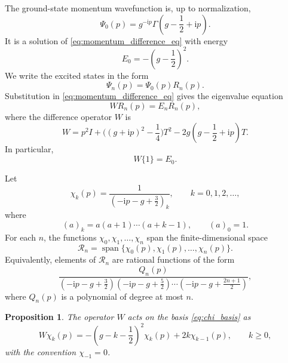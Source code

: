 \documentclass[10pt,a4paper]{amsart}
\newcommand{\ii}{\mathrm{i}}
\newcommand{\cR}{\mathcal{R}}
\numberwithin{equation}{section}
\newtheorem{proposition}[theorem]{Proposition}
\begin{document}
The ground-state momentum wavefunction is, up to normalization,
\begin{equation}
  \Psi_0(p)=g^{-\ii p}\Gamma\!\left(g-\frac12+\ii p\right).
  \label{eq:ground_state}
\end{equation}
It is a solution of \eqref{eq:momentum_difference_eq} with energy
\begin{equation}
  E_0=-\left(g-\frac12\right)^2.
\end{equation}
We write the excited states in the form
\begin{equation}
  \Psi_n(p)=\Psi_0(p)R_n(p).
  \label{eq:factorization}
\end{equation}
Substitution in \eqref{eq:momentum_difference_eq} gives the eigenvalue equation
\begin{equation}
  W R_n(p)=E_n R_n(p),
  \label{eq:W_eigenvalue}
\end{equation}
where the difference operator $W$ is
\begin{equation}
  W=p^2I+\bigl((g+\ii p)^2-\frac14\bigr)T^2
  -2g\left(g-\frac12+\ii p\right)T.
  \label{eq:W_operator}
\end{equation}
In particular,
\begin{equation}
  W\{1\}=E_0.
\end{equation}

Let
\begin{equation}
  \chi_k(p)=\frac{1}{\left(-\ii p-g+\frac32\right)_k},
  \qquad k=0,1,2,\dots,
  \label{eq:chi_basis}
\end{equation}
where
\begin{equation}
  (a)_k=a(a+1)\cdots(a+k-1),
  \qquad (a)_0=1.
\end{equation}
For each $n$, the functions $\chi_0,\chi_1,\dots,\chi_n$ span the finite-dimensional space
\begin{equation}
  \cR_n=\operatorname{span}\{\chi_0(p),\chi_1(p),\dots,\chi_n(p)\}.
\end{equation}
Equivalently, elements of $\cR_n$ are rational functions of the form
\begin{equation}
  \frac{Q_n(p)}{
  \left(-\ii p-g+\frac32\right)
  \left(-\ii p-g+\frac52\right)
  \cdots
  \left(-\ii p-g+\frac{2n+1}{2}\right)},
  \label{eq:rational_flag}
\end{equation}
where $Q_n(p)$ is a polynomial of degree at most $n$.

\begin{proposition}\label{prop:bidiagonal}
The operator $W$ acts on the basis \eqref{eq:chi_basis} as
\begin{equation}
  W\chi_k(p)=
  -\left(g-k-\frac12\right)^2\chi_k(p)+2k\chi_{k-1}(p),
  \qquad k\ge 0,
  \label{eq:bidiagonal_action}
\end{equation}
with the convention $\chi_{-1}=0$.
\end{proposition}
\end{document}

